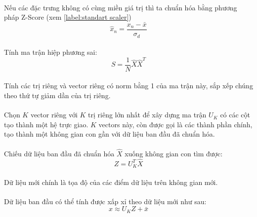 \paragraph{}{Nếu các đặc trưng không có cùng miền giá trị thì ta chuẩn hóa bằng phương pháp Z-Score (xem \ref{label:standart scaler})}
\[
\hat{x}_n = \frac{x_n - \bar{x}}{\sigma_d}
\]
\paragraph{}{Tính ma trận hiệp phương sai:}
\[
S = \frac{1}{N} \hat{X} \hat{X}^T
\]

\paragraph{}{Tính các trị riêng và vector riêng có norm bằng 1 của ma trận này, sắp xếp chúng theo thứ tự giảm dần của trị riêng.}

\paragraph{}{Chọn \( K \) vector riêng với \( K \) trị riêng lớn nhất để xây dựng ma trận \( U_K \) có các cột tạo thành một hệ trực giao. \( K \) vectors này, còn được gọi là các thành phần chính, tạo thành một không gian con gần với dữ liệu ban đầu đã chuẩn hóa.}

\paragraph{}{Chiếu dữ liệu ban đầu đã chuẩn hóa \( \hat{X} \) xuống không gian con tìm được:}
\[
Z = U_K^T \hat{X}
\]

\paragraph{}{Dữ liệu mới chính là tọa độ của các điểm dữ liệu trên không gian mới.}

\paragraph{}{Dữ liệu ban đầu có thể tính được xấp xỉ theo dữ liệu mới như sau:}
\[
x \approx U_K Z + \bar{x}
\]


